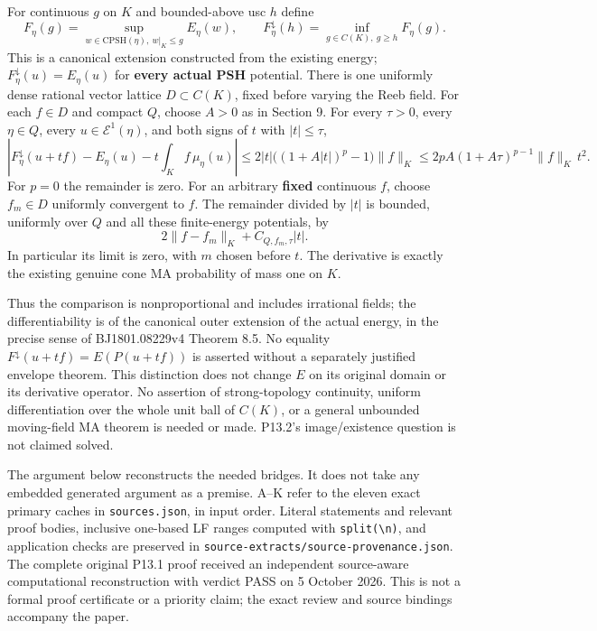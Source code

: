 \documentclass[
  10pt,
]{article}
\begin{document}
For continuous \(g\) on \(K\) and bounded-above usc \(h\) define \[
 F_\eta(g)=\sup_{w\in\mathrm{CPSH}(\eta),\ w|_K\leq g}E_\eta(w),\qquad
 F_\eta^\downarrow(h)=\inf_{g\in C(K),\ g\geq h}F_\eta(g).                                      \tag{4}
\] This is a canonical extension constructed from the existing energy;
\(F_\eta^\downarrow(u)=E_\eta(u)\) for \textbf{every actual PSH}
potential. There is one uniformly dense rational vector lattice
\(D\subset C(K)\), fixed before varying the Reeb field. For each
\(f\in D\) and compact \(Q\), choose \(A>0\) as in Section 9. For every
\(\tau>0\), every \(\eta\in Q\), every \(u\in\mathcal E^1(\eta)\), and
both signs of \(t\) with \(|t|\leq\tau\), \[
 \left|F_\eta^\downarrow(u+tf)-E_\eta(u)-t\int_K f\,\mu_\eta(u)\right|
 \leq 2|t|\big((1+A|t|)^p-1\big)\|f\|_K
 \leq 2pA(1+A\tau)^{p-1}\|f\|_K\,t^2.                                                        \tag{5}
\] For \(p=0\) the remainder is zero. For an arbitrary \textbf{fixed}
continuous \(f\), choose \(f_m\in D\) uniformly convergent to \(f\). The
remainder divided by \(|t|\) is bounded, uniformly over \(Q\) and all
these finite-energy potentials, by
\[ 2\|f-f_m\|_K+C_{Q,f_m,\tau}|t|.                                                            \tag{6}\]
In particular its limit is zero, with \(m\) chosen before \(t\). The
derivative is exactly the existing genuine cone MA probability of mass
one on \(K\).

Thus the comparison is nonproportional and includes irrational fields;
the differentiability is of the canonical outer extension of the actual
energy, in the precise sense of BJ1801.08229v4 Theorem 8.5. No equality
\(F^\downarrow(u+tf)=E(P(u+tf))\) is asserted without a separately
justified envelope theorem. This distinction does not change \(E\) on
its original domain or its derivative operator. No assertion of
strong-topology continuity, uniform differentiation over the whole unit
ball of \(C(K)\), or a general unbounded moving-field MA theorem is
needed or made. P13.2's image/existence question is not claimed solved.

The argument below reconstructs the needed bridges. It does not take any
embedded generated argument as a premise. A--K refer to the eleven exact
primary caches in \texttt{sources.json}, in input order. Literal
statements and relevant proof bodies, inclusive one-based LF ranges
computed with
\texttt{split(\textquotesingle{}\textbackslash{}n\textquotesingle{})},
and application checks are preserved in
\texttt{source-extracts/source-provenance.json}. The complete original
P13.1 proof received an independent source-aware computational
reconstruction with verdict PASS on 5 October 2026. This is not a formal
proof certificate or a priority claim; the exact review and source
bindings accompany the paper.
\end{document}
